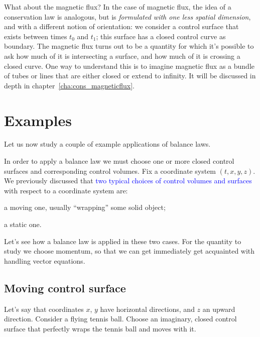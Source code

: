 \documentclass[a4paper,12pt,%
onecolumn,oneside,%
british%
]{memoir}
\renewcommand*{\|}[1][]{\nonscript\:#1\vert\nonscript\:\mathopen{}}
\newcommand*{\sect}{\S}%
\newcommand*{\chap}{chapter}%
\renewcommand*{\autoref}[3][\sect\,\ref]{\textcolor{blue}{#3}
\raisebox{0.6ex}{\color{blue}\miniscule%
\faIcon{angle-right}%
\;#1{#2}\;p.\,\pageref{#2}}}
\newcommand*{\yti}{t_{0}}
\newcommand*{\ytf}{t_{1}}
\begin{document}
\begin{extra}{What about the magnetic flux?}
  In the case of magnetic flux, the idea of a conservation law is analogous, but is \emph{formulated with one less spatial dimension}, and with a different notion of orientation: we consider a control surface that exists between times $\yti$ and $\ytf$; this surface has a closed control curve as boundary. The magnetic flux turns out to be a quantity for which it's possible to ask how much of it is intersecting a surface, and how much of it is crossing a closed curve. One way to understand this is to imagine magnetic flux as a bundle of tubes or lines that are either closed or extend to infinity. It will be discussed in depth in \chap~\ref{cha:cons_magneticflux}.
\end{extra}


\section{Examples}
\label{sec:example_balance_vect}

Let us now study a couple of example applications of balance laws.

In order to apply a balance law we must choose one or more closed control surfaces and corresponding control volumes. Fix a coordinate system $(t,x,y,z)$. We previously discussed that \autoref{sec:choice_control_volumes}{two typical choices of control volumes and surfaces} with respect to a coordinate system are:
\begin{enumerate*}[label=(\alph*)]
\item a moving one, usually \enquote{wrapping} some solid object;
\item a static one.
\end{enumerate*}
Let's see how a balance law is applied in these two cases. For the quantity to study we choose momentum, so that we can get immediately get acquainted with handling vector equations.

\subsection{Moving control surface}
\label{sec:example_balance_moving}

Let's say that coordinates $x$, $y$ have horizontal directions, and $z$ an upward direction. Consider a flying tennis ball. Choose an imaginary, closed control surface that perfectly wraps the tennis ball and moves with it.
\end{document}
